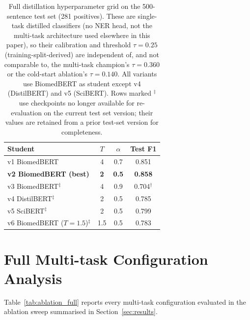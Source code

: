 \documentclass[a4paper,fleqn]{cas-sc}
\begin{document}
\begin{table}[H]
\centering
\small
\caption{Full distillation hyperparameter grid on the 500-sentence test set
(281 positives). These are single-task distilled classifiers (no NER head,
not the multi-task architecture used elsewhere in this paper), so their
calibration and threshold $\tau{=}0.25$ (training-split-derived) are independent
of, and not comparable to, the multi-task champion's $\tau{=}0.360$ or the
cold-start ablation's $\tau{=}0.140$.
All variants use BiomedBERT as student except v4 (DistilBERT)
and v5 (SciBERT). Rows marked $^{\ddagger}$ use checkpoints no longer
available for re-evaluation on the current test set version; their values
are retained from a prior test-set version for completeness.}
\label{tab:distillation_full}
\begin{tabular}{lccc}
\toprule
\textbf{Student} & $T$ & $\alpha$ & \textbf{Test F1} \\
\midrule
v1 BiomedBERT & 4 & 0.7 & 0.851 \\
\textbf{v2 BiomedBERT (best)} & \textbf{2} & \textbf{0.5} & \textbf{0.858} \\
v3 BiomedBERT$^{\ddagger}$ & 4 & 0.9 & 0.704$^{\dagger}$ \\
v4 DistilBERT$^{\ddagger}$ & 2 & 0.5 & 0.785 \\
v5 SciBERT$^{\ddagger}$    & 2 & 0.5 & 0.799 \\
v6 BiomedBERT ($T{=}1.5$)$^{\ddagger}$ & 1.5 & 0.5 & 0.783 \\
\bottomrule
\end{tabular}

\smallskip{}
\end{table}

\FloatBarrier
\section{Full Multi-task Configuration Analysis}
\label{app:fullablation}

Table~\ref{tab:ablation_full} reports every multi-task configuration
evaluated in the ablation sweep summarised in Section~\ref{sec:results}.
\end{document}
